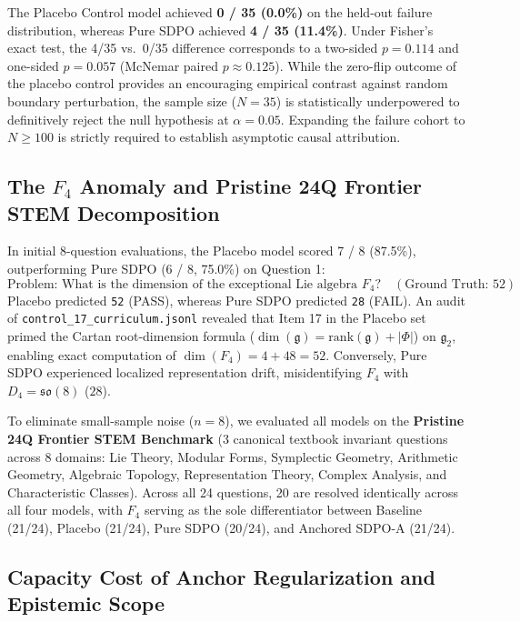 \documentclass[11pt,a4paper]{article}
\begin{document}
The Placebo Control model achieved \textbf{0 / 35 (0.0\%)} on the held-out failure distribution, whereas Pure SDPO achieved \textbf{4 / 35 (11.4\%)}. Under Fisher's exact test, the 4/35 vs.\ 0/35 difference corresponds to a two-sided $p = 0.114$ and one-sided $p = 0.057$ (McNemar paired $p \approx 0.125$). While the zero-flip outcome of the placebo control provides an encouraging empirical contrast against random boundary perturbation, the sample size ($N=35$) is statistically underpowered to definitively reject the null hypothesis at $\alpha = 0.05$. Expanding the failure cohort to $N \ge 100$ is strictly required to establish asymptotic causal attribution.

\subsection{The $F_4$ Anomaly and Pristine 24Q Frontier STEM Decomposition}

In initial 8-question evaluations, the Placebo model scored 7 / 8 (87.5\%), outperforming Pure SDPO (6 / 8, 75.0\%) on Question 1:
\[
\text{Problem: What is the dimension of the exceptional Lie algebra } F_4? \quad (\text{Ground Truth: } 52)
\]
Placebo predicted \texttt{52} (PASS), whereas Pure SDPO predicted \texttt{28} (FAIL). An audit of \texttt{control\_17\_curriculum.jsonl} revealed that Item 17 in the Placebo set primed the Cartan root-dimension formula ($\dim(\mathfrak{g}) = \mathrm{rank}(\mathfrak{g}) + |\Phi|$) on $\mathfrak{g}_2$, enabling exact computation of $\dim(F_4) = 4 + 48 = 52$. Conversely, Pure SDPO experienced localized representation drift, misidentifying $F_4$ with $D_4 = \mathfrak{so}(8)$ ($28$).

To eliminate small-sample noise ($n=8$), we evaluated all models on the \textbf{Pristine 24Q Frontier STEM Benchmark} (3 canonical textbook invariant questions across 8 domains: Lie Theory, Modular Forms, Symplectic Geometry, Arithmetic Geometry, Algebraic Topology, Representation Theory, Complex Analysis, and Characteristic Classes). Across all 24 questions, 20 are resolved identically across all four models, with $F_4$ serving as the sole differentiator between Baseline (21/24), Placebo (21/24), Pure SDPO (20/24), and Anchored SDPO-A (21/24).

\subsection{Capacity Cost of Anchor Regularization and Epistemic Scope}
\end{document}

